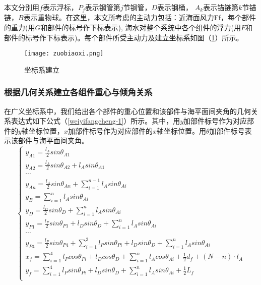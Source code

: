 \documentclass[withoutpreface,bwprint]{cumcmthesis} %
\begin{document}
\par 本文分别用$f$表示浮标，$P_j$表示钢管第$j$节钢管，$D$表示钢桶， $A_k$表示锚链第$k$节锚链，$B$表示重物球。在这里，本文所考虑的主动力包括：近海面风力Ff，每个部件的重力(用$G$和部件的标号作下标表示), 海水对整个系统中各个组件的浮力(用$F$和部件的标号作下标表示)。每个部件所受主动力及建立坐标系如图（\ref{fig:zuobiaoxi}）所示。

\begin{figure}[!htpb]
\small
\centering
\texttt{[image: zuobiaoxi.png]}
\caption{坐标系建立} \label{fig:zuobiaoxi}
\end{figure}
\subsubsection{根据几何关系建立各组件重心与倾角关系}
\par 在广义坐标系中，我们给出各个部件的重心位置和该部件与海平面间夹角的几何关系表达式如下公式（\ref{weiyifangcheng-1}）所示。其中，用$y$加部件标号作为对应部件的$y$轴坐标位置，$x$加部件标号作为对应部件的$x$轴坐标位置。用$\theta$加部件标号表示该部件与海平面间夹角。
\begin{equation}
	\label{weiyifangcheng-1}
	\left\{
	\begin{array}{lr}
		y_{A1} = \frac{l_A}{2} sin \theta_{A1}\\
		y_{A2} = \frac{l_A}{2} sin \theta_{A2} + l_A sin \theta_{A1}\\
		\cdots \\
		y_{An} = \frac{l_A}{2} sin \theta_{An} + \sum\limits_{i=1}^{n-1} l_A sin \theta_{Ai}\\
		y_B = \sum\limits_{i=1}^{n} l_A sin \theta_{Ai}\\
		y_D = \frac{l_D}{2} sin \theta_D + \sum\limits_{i=1}^{n} l_A sin \theta_{Ai}\\
		y_{P1} = \frac{l_P}{2} sin \theta_{P1} + l_D sin \theta_D + \sum\limits_{i=1}^{n} l_A sin \theta_{Ai}\\
		\cdots \\
		y_{P4} = \frac{l_P}{2} sin \theta_{P4} + \sum\limits_{i=1}^{3} l_P sin \theta_{Pi} + l_D sin \theta_D + \sum\limits_{i=1}^{n} l_A sin \theta_{Ai}\\
		x_f = \sum\limits_{i=1}^{4} l_P cos \theta_{Pi} + l_D cos \theta_D + \sum\limits_{i=1}^{n} l_A cos \theta_{Ai} + \frac{1}{2} d_f + (N - n) \cdot l_A\\
		y_f = \sum\limits_{i=1}^{4} l_P sin \theta_{Pi} + l_D sin \theta_D + \sum\limits_{i=1}^{n} l_A sin \theta_{Ai} + \frac{1}{2} L_f\\
	\end{array}
	\right.
\end{equation}
\end{document}
